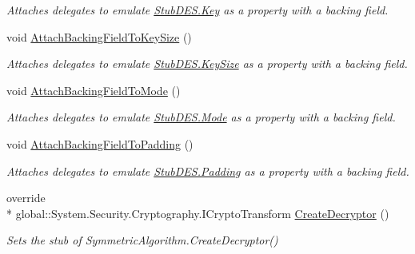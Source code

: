 \begin{DoxyCompactItemize}
\begin{DoxyCompactList}\small\item\em Attaches delegates to emulate \hyperlink{class_system_1_1_security_1_1_cryptography_1_1_fakes_1_1_stub_d_e_s_a430e3d5411d9577b731819c3b37b946b}{Stub\-D\-E\-S.\-Key} as a property with a backing field.\end{DoxyCompactList}\item 
void \hyperlink{class_system_1_1_security_1_1_cryptography_1_1_fakes_1_1_stub_d_e_s_a9a7d4c0350639b410154ebf17dedf48b}{Attach\-Backing\-Field\-To\-Key\-Size} ()
\begin{DoxyCompactList}\small\item\em Attaches delegates to emulate \hyperlink{class_system_1_1_security_1_1_cryptography_1_1_fakes_1_1_stub_d_e_s_aa671db5b6d066da1768ea1d6c8edcdfc}{Stub\-D\-E\-S.\-Key\-Size} as a property with a backing field.\end{DoxyCompactList}\item 
void \hyperlink{class_system_1_1_security_1_1_cryptography_1_1_fakes_1_1_stub_d_e_s_a8f55b17ad0dd9fe167279aba9bf037c7}{Attach\-Backing\-Field\-To\-Mode} ()
\begin{DoxyCompactList}\small\item\em Attaches delegates to emulate \hyperlink{class_system_1_1_security_1_1_cryptography_1_1_fakes_1_1_stub_d_e_s_aa71de308bb1c8003107eaf07d656883f}{Stub\-D\-E\-S.\-Mode} as a property with a backing field.\end{DoxyCompactList}\item 
void \hyperlink{class_system_1_1_security_1_1_cryptography_1_1_fakes_1_1_stub_d_e_s_a20ddb6ba9c17440aef4979f1e7b09afb}{Attach\-Backing\-Field\-To\-Padding} ()
\begin{DoxyCompactList}\small\item\em Attaches delegates to emulate \hyperlink{class_system_1_1_security_1_1_cryptography_1_1_fakes_1_1_stub_d_e_s_a452fe3e297f54a4efd3bf74e81dc2ee1}{Stub\-D\-E\-S.\-Padding} as a property with a backing field.\end{DoxyCompactList}\item 
override \\*
global\-::\-System.\-Security.\-Cryptography.\-I\-Crypto\-Transform \hyperlink{class_system_1_1_security_1_1_cryptography_1_1_fakes_1_1_stub_d_e_s_aa9f738c1af22f80678ef7bfa416963e5}{Create\-Decryptor} ()
\begin{DoxyCompactList}\small\item\em Sets the stub of Symmetric\-Algorithm.\-Create\-Decryptor()\end{DoxyCompactList}\item 

\end{DoxyCompactItemize}

